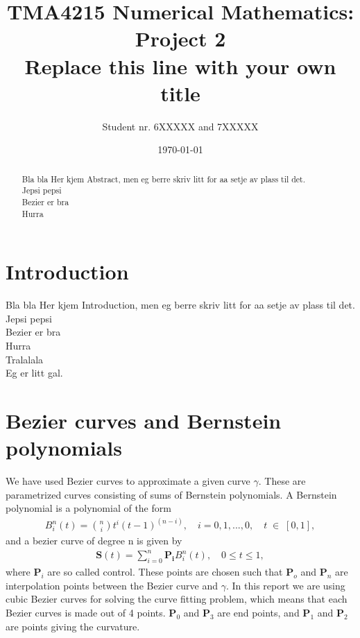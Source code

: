 \documentclass[10pt]{article}
\title{TMA4215 Numerical Mathematics: Project 2 \\ Replace this line with your own title}
\author{Student nr. 6XXXXX and 7XXXXX} %
\date{\today}
\begin{document}
\maketitle
\begin{abstract}

Bla bla Her kjem Abstract, men eg berre skriv litt for aa setje av plass til det. \\
Jepsi pepsi \\
Bezier er bra \\
Hurra \\

\end{abstract}

\section{Introduction} 

Bla bla Her kjem Introduction, men eg berre skriv litt for aa setje av plass til det. \\
Jepsi pepsi \\
Bezier er bra \\
Hurra \\
Tralalala \\
Eg er litt gal. \\



\section*{Bezier curves and Bernstein polynomials}

We have used Bezier curves to approximate a given curve $\gamma$. These are parametrized curves consisting of sums of Bernstein polynomials. A Bernstein polynomial is a polynomial of the form
\begin{align}
B_{i}^n(t) = \binom{n}{i}t^i(t-1)^{(n-i)},\quad i = 0, 1, ..., 0,\quad t \; \in \; [0,1],
\end{align}
and a bezier curve of degree n is given by
\begin{align}
\mathbf{S}(t) = \sum_{i=0}^{n} \mathbf{P_i} B_{i}^n(t), \quad 0 \leq t \leq 1,
\end{align}
where $\mathbf{P}_i$ are so called control. These points are chosen such that $\mathbf{P}_o$ and $\mathbf{P}_n$ are interpolation points between the Bezier curve and $\gamma$. In this report we are using cubic Bezier curves for solving the curve fitting problem, which means that each Bezier curves is made out of 4 points. $\mathbf{P}_0$ and $\mathbf{P}_3$ are end points, and $\mathbf{P}_1$ and $\mathbf{P}_2$ are points giving the curvature.
\end{document}
